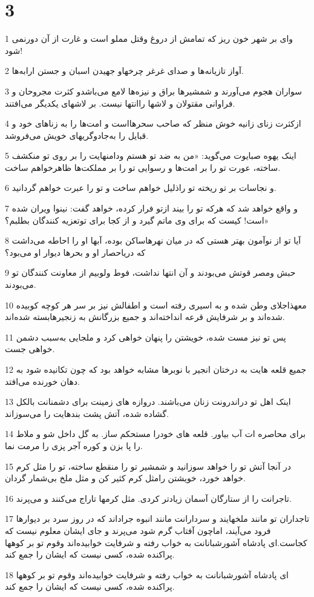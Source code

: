 \chapter{3}

\par 1 وای بر شهر خون ریز که تمامش از دروغ وقتل مملو است و غارت از آن دورنمی شود!
\par 2 آواز تازیانه‌ها و صدای غرغر چرخهاو جهیدن اسبان و جستن ارابه‌ها.
\par 3 سواران هجوم می‌آورند و شمشیرها براق و نیزه‌ها لامع می‌باشدو کثرت مجروحان و فراوانی مقتولان و لاشها راانتها نیست. بر لاشهای یکدیگر می‌افتند.
\par 4 ازکثرت زنای زانیه خوش منظر که صاحب سحرهااست و امت‌ها را به زناهای خود و قبایل را به‌جادوگریهای خویش می‌فروشد.
\par 5 اینک یهوه صبایوت می‌گوید: «من به ضد تو هستم ودامنهایت را بر روی تو منکشف ساخته، عورت تو را بر امت‌ها و رسوایی تو را بر مملکت‌ها ظاهرخواهم ساخت.
\par 6 و نجاسات بر تو ریخته تو راذلیل خواهم ساخت و تو را عبرت خواهم گردانید.
\par 7 و واقع خواهد شد که هر‌که تو را بیند ازتو فرار کرده، خواهد گفت: نینوا ویران شده است! کیست که برای وی ماتم گیرد و از کجا برای توتعزیه کنندگان بطلبم؟»
\par 8 آیا تو از نوآمون بهتر هستی که در میان نهرهاساکن بوده، آبها او را احاطه می‌داشت که دریاحصار او و بحرها دیوار او می‌بود؟
\par 9 حبش ومصر قوتش می‌بودند و آن انتها نداشت، فوط ولوبیم از معاونت کنندگان تو می‌بودند.
\par 10 معهذاجلای وطن شده و به اسیری رفته است و اطفالش نیز بر سر هر کوچه کوبیده شده‌اند و بر شرفایش قرعه انداخته‌اند و جمیع بزرگانش به زنجیرهابسته شده‌اند.
\par 11 پس تو نیز مست شده، خویشتن را پنهان خواهی کرد و ملجایی به‌سبب دشمن خواهی جست.
\par 12 جمیع قلعه هایت به درختان انجیر با نوبرها مشابه خواهد بود که چون تکانیده شود به دهان خورنده می‌افتد.
\par 13 اینک اهل تو دراندرونت زنان می‌باشند. دروازه های زمینت برای دشمنانت بالکل گشاده شده، آتش پشت بندهایت را می‌سوزاند.
\par 14 برای محاصره ات آب بیاور. قلعه های خودرا مستحکم ساز. به گل داخل شو و ملاط را پا بزن و کوره آجر پزی را مرمت نما.
\par 15 در آنجا آتش تو را خواهد سوزانید و شمشیر تو را منقطع ساخته، تو را مثل کرم خواهد خورد، خویشتن رامثل کرم کثیر کن و مثل ملخ بی‌شمار گردان.
\par 16 تاجرانت را از ستارگان آسمان زیادتر کردی. مثل کرمها تاراج می‌کنند و می‌پرند.
\par 17 تاجداران تو مانند ملخهایند و سردارانت مانند انبوه جراداند که در روز سرد بر دیوارها فرود می‌آیند، اماچون آفتاب گرم شود می‌پرند و جای ایشان معلوم نیست که کجاست.‌ای پادشاه آشورشبانانت به خواب رفته و شرفایت خوابیده‌اند وقوم تو بر کوهها پراکنده شده، کسی نیست که ایشان را جمع کند.
\par 18 ‌ای پادشاه آشورشبانانت به خواب رفته و شرفایت خوابیده‌اند وقوم تو بر کوهها پراکنده شده، کسی نیست که ایشان را جمع کند.



